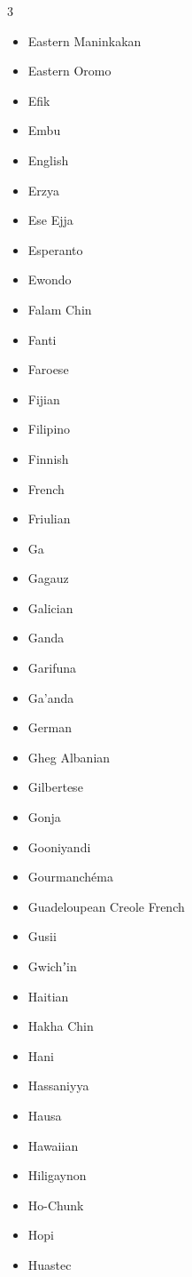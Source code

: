\documentclass[paper=a4, 10pt]{scrbook}
\begin{document}
\begin{multicols}{3}
\begin{itemize}
        \item Eastern Maninkakan
        \item Eastern Oromo
        \item Efik
        \item Embu
        \item English
        \item Erzya
        \item Ese Ejja
        \item Esperanto
        \item Ewondo
        \item Falam Chin
        \item Fanti
        \item Faroese
        \item Fijian
        \item Filipino
        \item Finnish
        \item French
        \item Friulian
        \item Ga
        \item Gagauz
        \item Galician
        \item Ganda
        \item Garifuna
        \item Ga’anda
        \item German
        \item Gheg Albanian
        \item Gilbertese
        \item Gonja
        \item Gooniyandi
        \item Gourmanchéma
        \item Guadeloupean Creole French
        \item Gusii
        \item Gwichʼin
        \item Haitian
        \item Hakha Chin
        \item Hani
        \item Hassaniyya
        \item Hausa
        \item Hawaiian
        \item Hiligaynon
        \item Ho-Chunk
        \item Hopi
        \item Huastec

\end{itemize}
\end{multicols}
\end{document}
